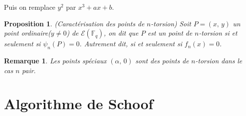 \documentclass[letterpaper, 12pt]{article}
\newtheorem{prop}{Proposition}
\newtheorem{rem}{Remarque}
\newcommand{\F}{\mathbb{F}_q}
\newcommand{\E}{\mathcal{E}}
\begin{document}
Puis on remplace $y^2$ par $x^3+ax+b$.
\begin{prop}(Caractérisation des points de $n$-torsion)
\newline
Soit $P=(x,\,y)$ un point ordinaire($y\neq 0$) de $\E(\F)$, on dit que $P$ est un point de $n$-torsion si et seulement si $\psi_n(P)=0$.
Autrement dit, si et seulement si $f_n(x)=0$.
\end{prop}
\begin{rem}
Les points spéciaux $(\alpha,\,0)$ sont des points de $n$-torsion dans le cas $n$ pair.
\end{rem}

\section{Algorithme de Schoof}
\end{document}
